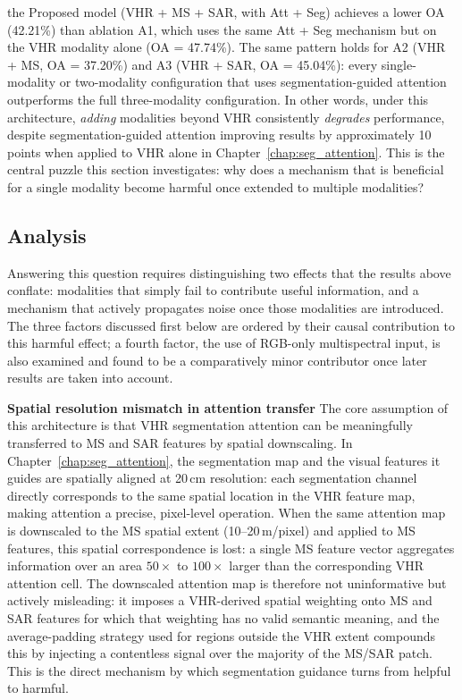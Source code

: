 the Proposed model
(VHR + MS + SAR, with Att + Seg) achieves a lower OA
(42.21\%) than ablation A1, which uses the same
Att + Seg mechanism but on the VHR modality alone
(OA = 47.74\%). The same pattern holds for A2 (VHR + MS,
OA = 37.20\%) and A3 (VHR + SAR, OA = 45.04\%): every
single-modality or two-modality configuration that uses
segmentation-guided attention outperforms the full
three-modality configuration. In other words, under this
architecture, \textit{adding} modalities beyond VHR
consistently \textit{degrades} performance, despite
segmentation-guided attention improving results by
approximately 10 points when applied to VHR alone in
Chapter~\ref{chap:seg_attention}. This is the central
puzzle this section investigates: why does a mechanism
that is beneficial for a single modality become harmful
once extended to multiple modalities?


\subsection{Analysis}
\label{sec:chap5_seg_analysis}
 
Answering this question requires distinguishing two
effects that the results above conflate: modalities that
simply fail to contribute useful information, and a
mechanism that actively propagates noise once those
modalities are introduced. The three factors discussed
first below are ordered by their causal contribution to
this harmful effect; a fourth factor, the use of
RGB-only multispectral input, is also examined and found
to be a comparatively minor contributor once later
results are taken into account.
 
\textbf{Spatial resolution mismatch in attention
transfer} The core
assumption of this architecture is that VHR segmentation
attention can be meaningfully transferred to MS and SAR
features by spatial downscaling. In
Chapter~\ref{chap:seg_attention}, the segmentation map
and the visual features it guides are spatially aligned at
20\,cm resolution: each segmentation channel directly
corresponds to the same spatial location in the VHR
feature map, making attention a precise, pixel-level
operation. When the same attention map is downscaled to
the MS spatial extent (10--20\,m/pixel) and applied to
MS features, this spatial correspondence is lost: a single
MS feature vector aggregates information over an area
$50\times$ to $100\times$ larger than the corresponding
VHR attention cell. The downscaled attention map is
therefore not uninformative but actively
misleading: it imposes a VHR-derived spatial
weighting onto MS and SAR features for which that
weighting has no valid semantic meaning, and the
average-padding strategy used for regions outside the VHR
extent compounds this by injecting a contentless
signal over the majority of the MS/SAR patch. This is the
direct mechanism by which segmentation guidance turns from
helpful to harmful.

